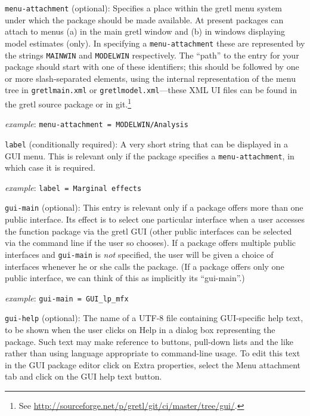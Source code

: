 \documentclass[oneside]{book}
\newcommand{\ttusage}[1]{\textit{example}: \quad \texttt{#1}}
\newcommand{\vbusage}[0]{\textit{example}: \quad}
\begin{document}
\begin{description}

\item \texttt{menu-attachment} (optional): Specifies a place within
  the gretl menu system under which the package should be made
  available. At present packages can attach to menus (a) in the main
  gretl window and (b) in windows displaying model estimates
  (only). In specifying a \texttt{menu-attachment} these are
  represented by the strings \texttt{MAINWIN} and \texttt{MODELWIN}
  respectively. The ``path'' to the entry for your package should
  start with one of these identifiers; this should be followed by one
  or more slash-separated elements, using the internal representation
  of the menu tree in \texttt{gretlmain.xml} or
  \texttt{gretlmodel.xml}---these XML UI files can be found in the
  gretl source package or in git.\footnote{See
    \url{http://sourceforge.net/p/gretl/git/ci/master/tree/gui/}.}

  \ttusage{menu-attachment = MODELWIN/Analysis}

\item \texttt{label} (conditionally required): A very short string
  that can be displayed in a GUI menu. This is relevant only if the
  package specifies a \texttt{menu-attachment}, in which case it is
  required.

  \ttusage{label = Marginal effects}

\item \texttt{gui-main} (optional): This entry is relevant only if a
  package offers more than one public interface. Its effect is to
  select one particular interface when a user accesses the function
  package via the gretl GUI (other public interfaces can be selected
  via the command line if the user so chooses). If a package offers
  multiple public interfaces and \texttt{gui-main} is \textit{not}
  specified, the user will be given a choice of interfaces whenever he
  or she calls the package. (If a package offers only one public
  interface, we can think of this as implicitly its ``gui-main''.)

  \vbusage{} \verb|gui-main = GUI_lp_mfx|

\item \texttt{gui-help} (optional): The name of a UTF-8 file
  containing GUI-specific help text, to be shown when the user clicks
  on \textsf{Help} in a dialog box representing the package. Such text
  may make reference to buttons, pull-down lists and the like rather
  than using language appropriate to command-line usage. To edit this
  text in the GUI package editor click on \textsf{Extra properties},
  select the \textsf{Menu attachment} tab and click on the \textsf{GUI
    help text} button.


\end{description}
\end{document}
